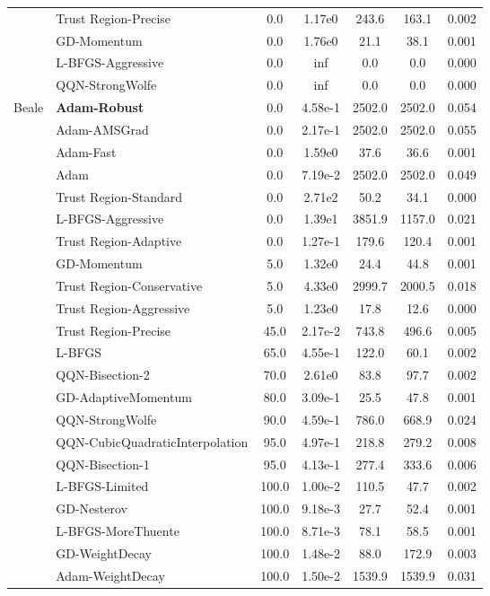 \documentclass{article}
\begin{document}
\begin{table}[htbp]
{\begin{tabular}{p{2.5cm}p{2.5cm}*{5}{c}}
 & Trust Region-Precise & 0.0 & 1.17e0 & 243.6 & 163.1 & 0.002 \\
 & GD-Momentum & 0.0 & 1.76e0 & 21.1 & 38.1 & 0.001 \\
 & L-BFGS-Aggressive & 0.0 & inf & 0.0 & 0.0 & 0.000 \\
 & QQN-StrongWolfe & 0.0 & inf & 0.0 & 0.0 & 0.000 \\
\midrule
\multirow{25}{*}{Beale} & \textbf{Adam-Robust} & 0.0 & 4.58e-1 & 2502.0 & 2502.0 & 0.054 \\
 & Adam-AMSGrad & 0.0 & 2.17e-1 & 2502.0 & 2502.0 & 0.055 \\
 & Adam-Fast & 0.0 & 1.59e0 & 37.6 & 36.6 & 0.001 \\
 & Adam & 0.0 & 7.19e-2 & 2502.0 & 2502.0 & 0.049 \\
 & Trust Region-Standard & 0.0 & 2.71e2 & 50.2 & 34.1 & 0.000 \\
 & L-BFGS-Aggressive & 0.0 & 1.39e1 & 3851.9 & 1157.0 & 0.021 \\
 & Trust Region-Adaptive & 0.0 & 1.27e-1 & 179.6 & 120.4 & 0.001 \\
 & GD-Momentum & 5.0 & 1.32e0 & 24.4 & 44.8 & 0.001 \\
 & Trust Region-Conservative & 5.0 & 4.33e0 & 2999.7 & 2000.5 & 0.018 \\
 & Trust Region-Aggressive & 5.0 & 1.23e0 & 17.8 & 12.6 & 0.000 \\
 & Trust Region-Precise & 45.0 & 2.17e-2 & 743.8 & 496.6 & 0.005 \\
 & L-BFGS & 65.0 & 4.55e-1 & 122.0 & 60.1 & 0.002 \\
 & QQN-Bisection-2 & 70.0 & 2.61e0 & 83.8 & 97.7 & 0.002 \\
 & GD-AdaptiveMomentum & 80.0 & 3.09e-1 & 25.5 & 47.8 & 0.001 \\
 & QQN-StrongWolfe & 90.0 & 4.59e-1 & 786.0 & 668.9 & 0.024 \\
 & QQN-CubicQuadraticInterpolation & 95.0 & 4.97e-1 & 218.8 & 279.2 & 0.008 \\
 & QQN-Bisection-1 & 95.0 & 4.13e-1 & 277.4 & 333.6 & 0.006 \\
 & L-BFGS-Limited & 100.0 & 1.00e-2 & 110.5 & 47.7 & 0.002 \\
 & GD-Nesterov & 100.0 & 9.18e-3 & 27.7 & 52.4 & 0.001 \\
 & L-BFGS-MoreThuente & 100.0 & 8.71e-3 & 78.1 & 58.5 & 0.001 \\
 & GD-WeightDecay & 100.0 & 1.48e-2 & 88.0 & 172.9 & 0.003 \\
 & Adam-WeightDecay & 100.0 & 1.50e-2 & 1539.9 & 1539.9 & 0.031 \\

\end{tabular}}
\end{table}
\end{document}
